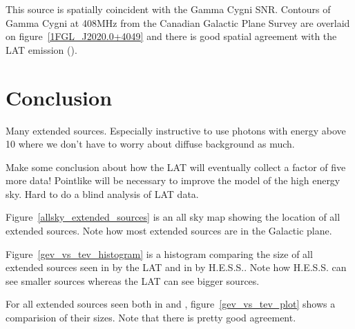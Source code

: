 \documentclass[12pt,preprint]{aastex}
\newcommand{\gev}{\text{GeV}\xspace}
\newcommand{\tev}{\text{TeV}\xspace}
\begin{document}
This source is spatially coincident with the Gamma Cygni SNR.  Contours of
Gamma Cygni at 408MHz from the Canadian Galactic Plane Survey are overlaid
on figure~\ref{1FGL_J2020.0+4049} and there is good spatial agreement
with the LAT emission (\cite{canadian_galactic_plane_survey}).


\section{Conclusion}


Many extended sources. Especially instructive to
use photons with energy above 10 \gev where we don't have
to worry about diffuse background as much.

Make some conclusion about how the LAT will eventually collect a factor
of five more data! Pointlike will be necessary to improve the model of the
high energy sky. Hard to do a blind analysis of LAT data.

Figure~\ref{allsky_extended_sources} is an all sky map showing the
location of all \gev extended sources. Note how most
extended sources are in the Galactic plane.

Figure~\ref{gev_vs_tev_histogram} is a histogram comparing the size of
all extended sources seen in \gev by the LAT and in \tev by H.E.S.S..
Note how H.E.S.S. can see smaller sources whereas the LAT
can see bigger sources.

For all extended sources seen both in \gev and \tev,
figure~\ref{gev_vs_tev_plot} shows a comparision of their sizes.
Note that there is pretty good agreement.





\appendix
\end{document}
